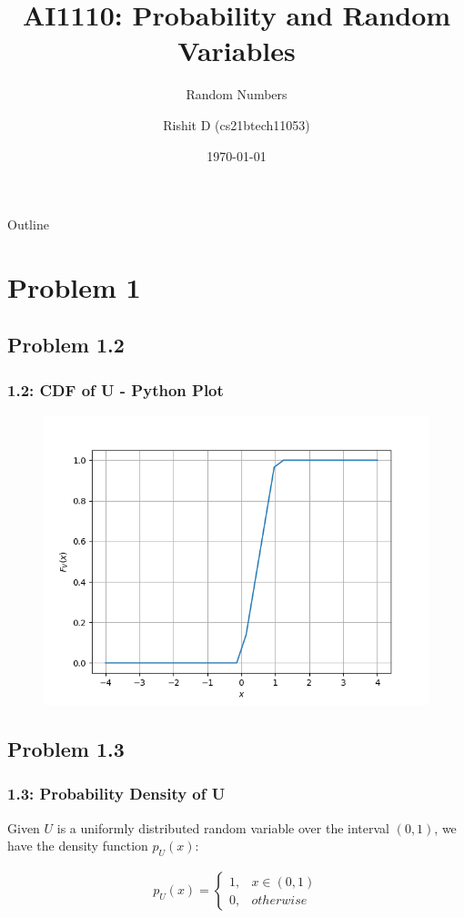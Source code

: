 \documentclass{beamer}
\title{AI1110: Probability and Random Variables}
\subtitle{Random Numbers}
\author{Rishit D (cs21btech11053)}
\institute{IIT Hyderabad}
\date{\today}
\begin{document}
\begin{frame}
	\titlepage 
\end{frame}

\begin{frame}{Outline}
	\tableofcontents
\end{frame}

\section{Problem 1}

\subsection{Problem 1.2}
\begin{frame}
	\frametitle{1.2: CDF of U - Python Plot}
	\begin{figure}
		\centerline{\includegraphics[width=\textheight]{../figs/uni_cdf.png}}
		\label{fig1}
	\end{figure}
	
\end{frame}	

\subsection{Problem 1.3}
\begin{frame}
	\frametitle{1.3: Probability Density of U}

	Given $U$ is a uniformly distributed random variable over the interval $(0, 1)$, we have the density function $p_U(x)$:

	\begin{align}
		p_U(x) = 
		\begin{cases}
			1, & x \in (0, 1) \\
			0, & otherwise
		\end{cases}
		\label{eq:PDF}
	\end{align}
\end{frame}
\end{document}
